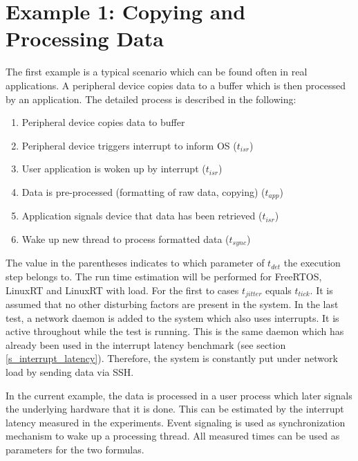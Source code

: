 \section{Example 1: Copying and Processing Data}\label{ss_example_1}
The first example is a typical scenario which can be found often in real applications. 
A peripheral device copies data to a buffer which is then processed by an application. 
The detailed process is described in the following:
\begin{enumerate}
	\item Peripheral device copies data to buffer
	\item	Peripheral device triggers interrupt to inform OS ($t_{isr}$)
	\item User application is woken up by interrupt ($t_{isr}$)
	\item Data is pre-processed (formatting of raw data, copying) ($t_{app}$)
	\item Application signals device that data has been retrieved ($t_{isr}$)
	\item Wake up new thread to process formatted data ($t_{sync}$)
\end{enumerate}
The value in the parentheses indicates to which parameter of $t_{det}$ the execution step belongs to.
The run time estimation will be performed for FreeRTOS, LinuxRT and LinuxRT with load.
For the first to cases $t_{jitter}$ equals $t_{tick}$.
It is assumed that no other disturbing factors are present in the system.
In the last test, a network daemon is added to the system which also uses interrupts.
It is active throughout while the test is running. 
This is the same daemon which has already been used in the interrupt latency benchmark (see section \ref{s_interrupt_latency}). 
Therefore, the system is constantly put under network load by sending data via \ac{SSH}.
\par
In the current example, the data is processed in a user process which later signals the underlying hardware that it is done. 
This can be estimated by the interrupt latency measured in the experiments. 
Event signaling is used as synchronization mechanism to wake up a processing thread.
All measured times can be used as parameters for the two formulas.

